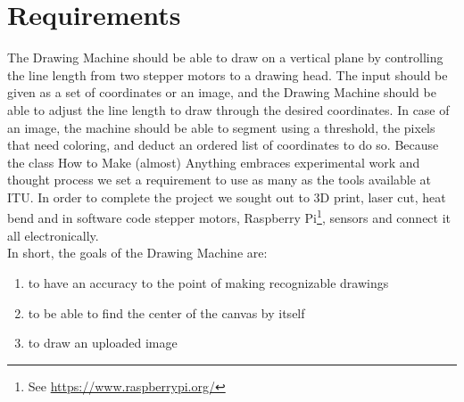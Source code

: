 
\section{Requirements}
The Drawing Machine should be able to draw on a vertical plane by controlling the line length from two stepper motors to a drawing head. The input should be given as a set of coordinates or an image, and the Drawing Machine should be able to adjust the line length to draw through the desired coordinates. In case of an image, the machine should be able to segment using a threshold, the pixels that need coloring, and deduct an ordered list of coordinates to do so. Because the class How to Make (almost) Anything embraces experimental work and thought process we set a requirement to use as many as the tools available at ITU. In order to complete the project we sought out to 3D print, laser cut, heat bend and in software code stepper motors, Raspberry Pi\footnote{See \url{https://www.raspberrypi.org/}}, sensors and connect it all electronically.\\
In short, the goals of the Drawing Machine are:
\begin{enumerate}
    \item to have an accuracy to the point of making recognizable drawings
    \item to be able to find the center of the canvas by itself
    \item to draw an uploaded image
\end{enumerate}